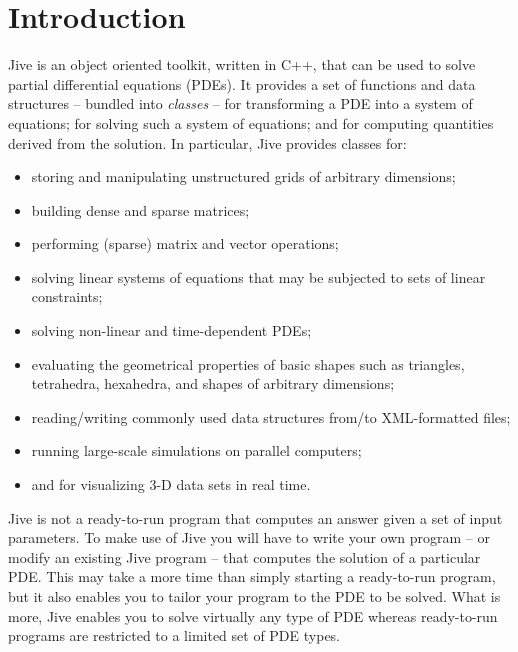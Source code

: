 
\chapter{Introduction}

Jive is an object oriented toolkit, written in C++, that can be used to
solve partial differential equations (PDEs). It provides a set of
functions and data structures -- bundled into \emph{classes} -- for
transforming a PDE into a system of equations; for solving such a system
of equations; and for computing quantities derived from the solution. In
particular, Jive provides classes for:
\begin{itemize}

\item storing and manipulating unstructured grids of arbitrary
  dimensions;

\item building dense and sparse matrices;

\item performing (sparse) matrix and vector operations;

\item solving linear systems of equations that may be subjected to sets
  of linear constraints;

\item solving non-linear and time-dependent PDEs;

\item evaluating the geometrical properties of basic shapes such as
  triangles, tetrahedra, hexahedra, and shapes of arbitrary
  dimensions;

\item reading/writing commonly used data structures from/to XML-formatted
  files;

\item running large-scale simulations on parallel computers;

\item and for visualizing 3-D data sets in real time.

\end{itemize}
Jive is not a ready-to-run program that computes an answer given a set of
input parameters. To make use of Jive you will have to write your own
program -- or modify an existing Jive program -- that computes the
solution of a particular PDE. This may take a more time than simply
starting a ready-to-run program, but it also enables you to tailor your
program to the PDE to be solved. What is more, Jive enables you to solve
virtually any type of PDE whereas ready-to-run programs are restricted to
a limited set of PDE types.

